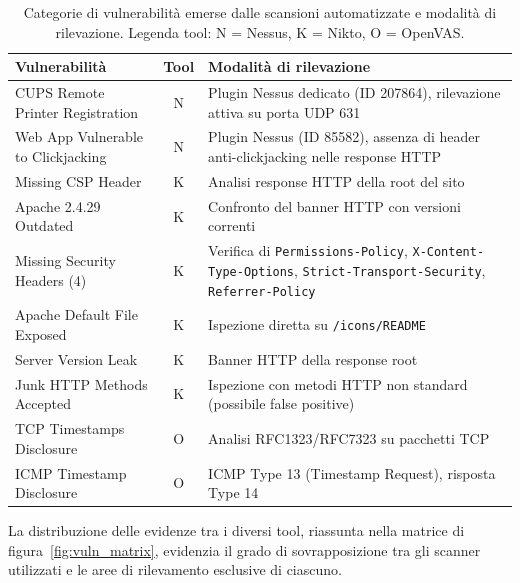 \documentclass[11pt]{report}
\begin{document}
	\begin{table}[H]
		\centering
		\renewcommand{\arraystretch}{1.3}
		\begin{tabular}{l c p{7cm}}
			\toprule
			\textbf{Vulnerabilità} & \textbf{Tool} & \textbf{Modalità di rilevazione} \\
			\midrule
			CUPS Remote Printer Registration & N & Plugin Nessus dedicato (ID 207864), rilevazione attiva su porta UDP 631 \\
			Web App Vulnerable to Clickjacking & N & Plugin Nessus (ID 85582), assenza di header anti-clickjacking nelle response HTTP \\
			Missing CSP Header & K & Analisi response HTTP della root del sito \\
			Apache 2.4.29 Outdated & K & Confronto del banner HTTP con versioni correnti \\
			Missing Security Headers (4) & K & Verifica di \texttt{Permissions-Policy}, \texttt{X-Content-Type-Options}, \texttt{Strict-Transport-Security}, \texttt{Referrer-Policy} \\
			Apache Default File Exposed & K & Ispezione diretta su \texttt{/icons/README} \\
			Server Version Leak & K & Banner HTTP della response root \\
			Junk HTTP Methods Accepted & K & Ispezione con metodi HTTP non standard (possibile false positive) \\
			TCP Timestamps Disclosure & O & Analisi RFC1323/RFC7323 su pacchetti TCP \\
			ICMP Timestamp Disclosure & O & ICMP Type 13 (Timestamp Request), risposta Type 14 \\
			\bottomrule
		\end{tabular}
		\caption{Categorie di vulnerabilità emerse dalle scansioni automatizzate e modalità di rilevazione. Legenda tool: N = Nessus, K = Nikto, O = OpenVAS.}
		\label{tab:automated_scans}
	\end{table}
	
	La distribuzione delle evidenze tra i diversi tool, riassunta nella matrice di figura~\ref{fig:vuln_matrix}, evidenzia il grado di sovrapposizione tra gli scanner utilizzati e le aree di rilevamento esclusive di ciascuno.
	
\end{document}
